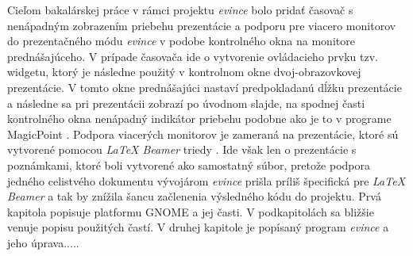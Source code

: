 \documentclass[12pt,oneside,final]{fithesis2}
\begin{document}
Cieľom bakalárskej práce v rámci projektu \emph{evince} bolo pridať časovač s nenápadným zobrazením priebehu prezentácie a podporu pre viacero monitorov do prezentačného módu \emph{evince} v podobe kontrolného okna na monitore prednášajúceho. V prípade časovača ide o vytvorenie ovládacieho prvku tzv. widgetu, ktorý je následne použitý v kontrolnom okne dvoj-obrazovkovej prezentácie. V tomto okne prednášajúci nastaví predpokladanú dĺžku prezentácie a následne sa pri prezentácii zobrazí po úvodnom slajde, na spodnej časti kontrolného okna nenápadný indikátor priebehu podobne ako je to v programe MagicPoint \cite{mgp}. Podpora viacerých monitorov je zameraná na prezentácie, ktoré sú vytvorené pomocou \emph{LaTeX Beamer} triedy \cite{beamer}. Ide však len o prezentácie s poznámkami, ktoré boli vytvorené ako samostatný súbor, pretože podpora jedného celistvého dokumentu vývojárom \emph{evince} prišla príliš špecifická pre \emph{LaTeX Beamer} a tak by znížila šancu začlenenia výsledného kódu do projektu.
Prvá kapitola popisuje platformu GNOME a jej časti. V podkapitolách sa bližšie venuje popisu použitých častí. V druhej kapitole je popísaný program \emph{evince} a jeho úprava..... %
\end{document}
